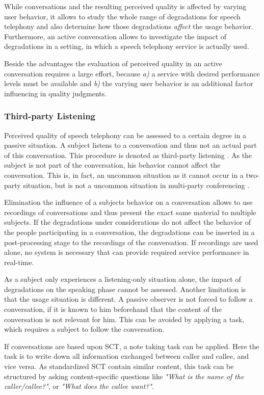 While conversations and the resulting perceived quality is affected by varying user behavior, it allows to study the whole range of degradations for speech telephony and also determine how those degradations \emph{affect} the usage behavior.
Furthermore, an active conversation allows to investigate the impact of degradations in a setting, in which a speech telephony service is actually used.

Beside the advantages the evaluation of perceived quality in an active conversation requires a large effort, because \emph{a)} a service with desired performance levels must be available and \emph{b)} the varying user behavior is an additional factor influencing in quality judgments.

\subsubsection*{Third-party Listening}
Perceived quality of speech telephony can be assessed to a certain degree in a passive situation.
A subject listens to a conversation and thus not an actual part of this conversation.
This procedure is denoted as third-party listening \citep[\cf, ][p. 13]{itu-t_p.832:_2000}.
As the subject is not part of the conversation, his behavior cannot affect the conversation.
This is, in fact, an uncommon situation as it cannot occur in a two-party situation, but is not a uncommon situation in multi-party conferencing .

Elimination the influence of a subjects behavior on a conversation allows to use recordings of conversations and thus present the exact same material to multiple subjects.
If the degradations under considerations do not affect the behavior of the people participating in a conversation, the degradations can be inserted in a post-processing stage to the recordings of the conversation.
If recordings are used alone, no system is necessary that can provide required service performance in real-time.

As a subject only experiences a listening-only situation alone, the impact of degradations on the speaking phase cannot be assessed.
Another limitation is that the usage situation is different.
A passive observer is not forced to follow a conversation, if it is known to him beforehand that the content of the conversation is not relevant for him.
This can be avoided by applying a task, which requires a subject to follow the conversation.

If conversations are based upon \acs{SCT}, a note taking task can be applied.
Here the task is to write down all information exchanged between caller and callee, and vice versa.
As standardized \acs{SCT} \citep{itu-t_p.805:_2007} contain similar content, this task can be structured by asking content-specific questions like \emph{"What is the name of the caller/callee?"}, or \emph{"What does the callee want?"}.

